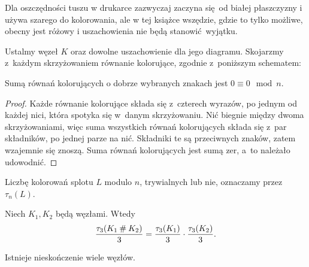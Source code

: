 Dla oszczędności tuszu w drukarce zazwyczaj zaczyna się od białej płaszczyzny i używa szarego do kolorowania, ale w tej książce wszędzie, gdzie to tylko możliwe, obecny jest różowy i uszachowienia nie będą stanowić wyjątku.

Ustalmy węzeł $K$ oraz dowolne uszachowienie dla jego diagramu.
Skojarzmy z~każdym skrzyżowaniem równanie kolorujące, zgodnie z~poniższym schematem:

\begin{proposition}
\label{prp:colouring_sum_zero}%
    Sumą równań kolorujących o dobrze wybranych znakach jest $0 \equiv 0 \mod n$.
\end{proposition}

\begin{proof}
    Każde równanie kolorujące składa się z~czterech wyrazów, po jednym od każdej nici, która spotyka się w~danym skrzyżowaniu.
    Nić biegnie między dwoma skrzyżowaniami, więc suma wszystkich równań kolorujących składa się z~par składników, po jednej parze na nić.
    Składniki te są przeciwnych znaków, zatem wzajemnie się znoszą.
    Suma równań kolorujących jest sumą zer, a~to należało udowodnić.
\end{proof}

Liczbę kolorowań splotu $L$ modulo $n$, trywialnych lub nie, oznaczamy przez $\tau_n(L)$.

\begin{proposition}
    Niech $K_1, K_2$ będą węzłami.
    Wtedy 
    \begin{equation}
        \frac{\tau_3(K_1 \mathbin{\#} K_2)}{3} = \frac{\tau_3(K_1)}{3} \cdot \frac{\tau_3(K_2)}{3}.
    \end{equation}
\end{proposition}

\begin{corollary}
    Istnieje nieskończenie wiele węzłów.
\end{corollary}

